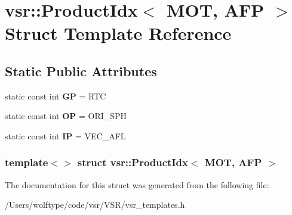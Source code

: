 \hypertarget{structvsr_1_1_product_idx_3_01_m_o_t_00_01_a_f_p_01_4}{\section{vsr\-:\-:Product\-Idx$<$ M\-O\-T, A\-F\-P $>$ Struct Template Reference}
\label{structvsr_1_1_product_idx_3_01_m_o_t_00_01_a_f_p_01_4}
}
\subsection*{Static Public Attributes}
\begin{DoxyCompactItemize}
\item 
\hypertarget{structvsr_1_1_product_idx_3_01_m_o_t_00_01_a_f_p_01_4_a93b502acc371ec3e716f91c9356f05f4}{static const int {\bfseries G\-P} = R\-T\-C}\label{structvsr_1_1_product_idx_3_01_m_o_t_00_01_a_f_p_01_4_a93b502acc371ec3e716f91c9356f05f4}

\item 
\hypertarget{structvsr_1_1_product_idx_3_01_m_o_t_00_01_a_f_p_01_4_aacd1264d1f235323c7f49a107fdc7fc4}{static const int {\bfseries O\-P} = O\-R\-I\-\_\-\-S\-P\-H}\label{structvsr_1_1_product_idx_3_01_m_o_t_00_01_a_f_p_01_4_aacd1264d1f235323c7f49a107fdc7fc4}

\item 
\hypertarget{structvsr_1_1_product_idx_3_01_m_o_t_00_01_a_f_p_01_4_a1d43a5c25af93ca18fe77c47be71569a}{static const int {\bfseries I\-P} = V\-E\-C\-\_\-\-A\-F\-L}\label{structvsr_1_1_product_idx_3_01_m_o_t_00_01_a_f_p_01_4_a1d43a5c25af93ca18fe77c47be71569a}

\end{DoxyCompactItemize}
\subsubsection*{template$<$$>$ struct vsr\-::\-Product\-Idx$<$ M\-O\-T, A\-F\-P $>$}



The documentation for this struct was generated from the following file\-:\begin{DoxyCompactItemize}
\item 
/\-Users/wolftype/code/vsr/\-V\-S\-R/vsr\-\_\-templates.\-h\end{DoxyCompactItemize}
